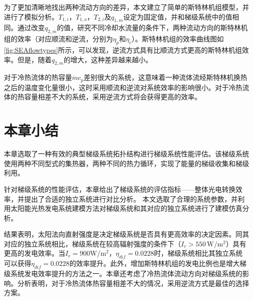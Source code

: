 为了更加清晰地找出两种流动方向的差异，本文建立了简单的斯特林机组模型，并进行了模拟分析。$T_{1,i}，T_{1,o}，T_{2,i}及q_{1,m}$设定为固定值，并和梯级系统中的值相同。通过改变$q_{2,m}$的值，研究不同冷却水流量的条件下，两种流动方向的斯特林机组的效率（对应顺流和逆流，分别为$\eta_p$和$\eta_c$）。斯特林机组的效率曲线图如\autoref{fig:SEAflowtypes}所示，可以发现，逆流方式具有比顺流方式更高的斯特林机组效率。但是，随着$q_{2,m}$的增大，这种差异越来越小。

对于冷热流体的热容量$\dot{m}c_p$差别很大的系统，这意味着一种流体流经斯特林机换热之后的温度变化量很小，这时采用顺流和逆流对系统效率的影响很小。对于冷热流体的热容量相差不大的系统，采用逆流方式将会获得更高的效率。

\section{本章小结}

本章选取了一种有效的典型梯级系统拓扑结构进行梯级系统性能评估。该梯级系统使用两种不同型式的集热器，两种不同的热力循环，实现了能量的梯级收集和梯级利用。

针对梯级系统的性能评估，本章给出了梯级系统的评估指标——整体光电转换效率，并提出了合适的独立系统进行对比分析。
本文选取了合理的系统参数，并利用太阳能光热发电系统建模方法对梯级系统和其对应的独立系统进行了建模仿真分析。

结果表明，太阳法向直射强度是决定梯级系统是否具有更高效率的决定因素。同其对应的独立系统相比，梯级系统在较高辐射强度的条件下（$I_r > 550\,\mathrm{W/m^2}$）具有更高的发电效率。当$I_r=900$W/m$^2$，$\eta_{dif}=0.0228$时，梯级系统相比其独立系统可以获得$\eta_{dif}=0.0228$的效率提升。此外，增加斯特林机组的发电比例也是增大梯级系统发电效率提升的方法之一。本章还考虑了冷热流体流动方向对梯级系统的影响。分析表明，对于冷热流体热容量相差不大的情况，采用逆流方式是最佳的选择方案。

